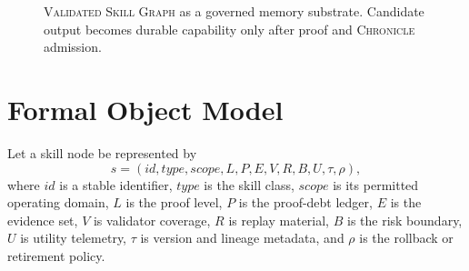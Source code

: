 \documentclass[10.5pt]{article}
\theoremstyle{goThm}
\newcommand{\vsg}{\textsc{Validated Skill Graph}}
\newcommand{\chronicle}{\textsc{Chronicle}}
\begin{document}
\begin{figure}[H]
{}
\caption{\vsg{} as a governed memory substrate. Candidate output becomes durable capability only after proof and \chronicle{} admission.}
\label{fig:substrate}
\end{figure}

\section{Formal Object Model}
Let a skill node be represented by
\begin{equation}
  s = (id, type, scope, L, P, E, V, R, B, U, \tau, \rho),
\end{equation}
where \(id\) is a stable identifier, \(type\) is the skill class, \(scope\) is its permitted operating domain, \(L\) is the proof level, \(P\) is the proof-debt ledger, \(E\) is the evidence set, \(V\) is validator coverage, \(R\) is replay material, \(B\) is the risk boundary, \(U\) is utility telemetry, \(\tau\) is version and lineage metadata, and \(\rho\) is the rollback or retirement policy.
\end{document}
